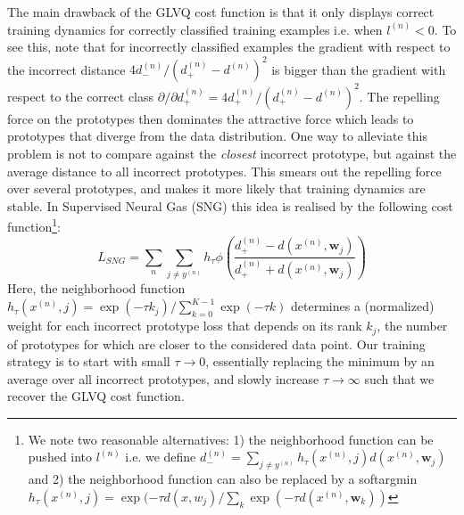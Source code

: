 \documentclass{esannV2}
\begin{document}
The main drawback of the GLVQ cost function is that it only displays correct training dynamics for correctly classified training examples\cite{sato1996generalized} i.e. when $l^{(n)} < 0$. To see this, note that for incorrectly classified examples the gradient with respect to the incorrect distance $4d^{(n)}_-/(d^{(n)}_+ - d^{(n)})^2$ is bigger than the gradient with respect to the correct class $\partial / \partial d^{(n)}_+ = 4d^{(n)}_+/(d^{(n)}_+ - d^{(n)})^2$. The repelling force on the prototypes then dominates the attractive force which leads to prototypes that diverge from the data distribution. One way to alleviate this problem is not to compare against the \emph{closest} incorrect prototype, but against the average distance to all incorrect prototypes. This smears out the repelling force over several prototypes, and makes it more likely that training dynamics are stable. In Supervised Neural Gas (SNG) \cite{SNG} this idea is realised by the following cost function\footnote{We note two reasonable alternatives: 1) the neighborhood function can be pushed into $l^{(n)}$ i.e. we define $d^{(n)}_- = \sum_{j \neq y^{(n)}} h_\tau(x^{(n)}, j) d(x^{(n)}, \mathbf{w}_j)$ and 2) the neighborhood function can also be replaced by a softargmin $h_\tau(x^{(n)}, j) = \exp(-\tau d(x, w_j)/\sum_k \exp(-\tau d(x^{(n)}, \mathbf{w}_k))$}:
\begin{equation}
 L_{SNG} = \sum_n \sum_{j\neq y^{(n)}} h_\tau \phi\left(\frac{d^{(n)}_+ - d(x^{(n)}, \mathbf{w}_j)}{d^{(n)}_+ + d(x^{(n)}, \mathbf{w}_j)}\right)
\end{equation}
Here, the neighborhood function $h_\tau(x^{(n)}, j) = \exp(-\tau k_j)/ \sum_{k=0}^{K-1} \exp(-\tau k)$ determines a (normalized) weight for each incorrect prototype loss that depends on its rank $k_j$, the number of prototypes for which are closer to the considered data point. Our training strategy is to start with small $\tau \rightarrow 0$, essentially replacing the minimum by an average over all incorrect prototypes, and slowly increase $\tau \rightarrow \infty$ such that we recover the GLVQ cost function. 

\end{document}
